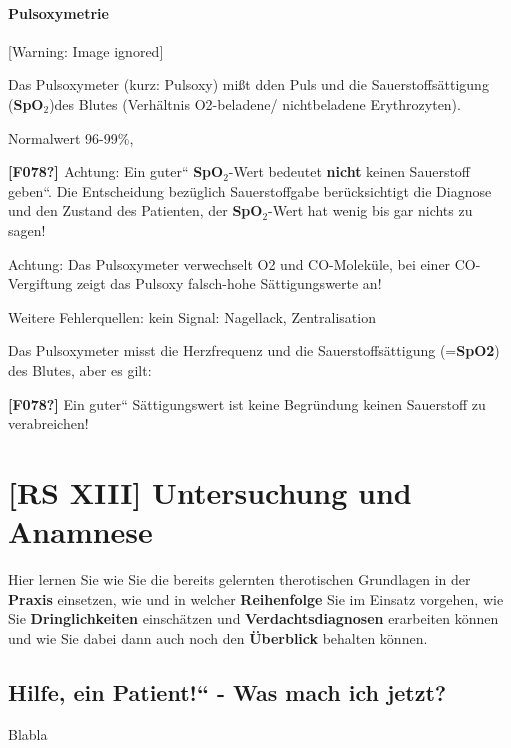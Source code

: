 \documentclass{article}
\newcommand\gSub[1]{\ensuremath{{}_{\text{#1}}}}
\newcommand\gEs[1]{\textbf{\textcolor[rgb]{0.0,0.0,0.5019608}{#1}}}
\newcommand\gEs[1]{\textbf{\textcolor[rgb]{0.0,0.0,0.5019608}{#1}}}
\newcommand\gT[1]{\textbf{\textup{\textcolor[rgb]{0.0,0.5019608,0.0}{#1}}}}
\begin{document}
\paragraph[Pulsoxymetrie]{Pulsoxymetrie%
%
}
\begin{center}
 [Warning: Image ignored] %

\end{center}
{\mdseries
Das Pulsoxymeter (kurz: Pulsoxy) mi{\ss}t dden Puls und die
Sauerstoffs\"attigung
(\gT{SpO}\gT{\gSub{2}})des
Blutes (Verh\"altnis O2-beladene/ nichtbeladene Erythrozyten). }

{\mdseries
Normalwert 96-99\%, }

{\mdseries
\textbf{\textcolor[rgb]{0.7882353,0.0,0.08627451}{[F078?] }}Achtung: Ein
{\quotedblbase}guter{\textquotedblleft}
\gT{SpO}\gT{\gSub{2}}{}-Wert
bedeutet \gEs{nicht} {\quotedblbase}keinen
Sauerstoff geben{\textquotedblleft}. Die Entscheidung bez\"uglich
Sauerstoffgabe ber\"ucksichtigt die Diagnose und den Zustand des
Patienten, der
\gT{SpO}\gT{\gSub{2}}{}-Wert
hat wenig bis gar nichts zu sagen! }

{\mdseries\color{black}
Achtung: Das Pulsoxymeter verwechselt O2 und CO-Molek\"ule, bei einer
CO-Vergiftung zeigt das Pulsoxy falsch-hohe S\"attigungswerte an!}

{\mdseries
Weitere Fehlerquellen: kein Signal: Nagellack, Zentralisation}

{\mdseries
Das Pulsoxymeter misst die Herzfrequenz und die Sauerstoffs\"attigung
(=\gT{SpO2}) des Blutes, aber es gilt:}

{\mdseries\color{black}
\textbf{\textcolor[rgb]{0.7882353,0.0,0.08627451}{[F078?]}} Ein
{\quotedblbase}guter{\textquotedblleft} S\"attigungswert ist keine
Begr\"undung keinen Sauerstoff zu verabreichen!}

\section{[RS XIII] Untersuchung und Anamnese}
Hier lernen Sie wie Sie die bereits gelernten therotischen Grundlagen in
der \gEs{Praxis} einsetzen, wie und in welcher
\gEs{Reihenfolge} Sie im Einsatz vorgehen, wie Sie
\gEs{Dringlichkeiten} einsch\"atzen und
\gEs{Verdachtsdiagnosen} erarbeiten k\"onnen und wie
Sie dabei dann auch noch den \gEs{\"Uberblick}
behalten k\"onnen.

\subsection{{\quotedblbase}Hilfe, ein Patient!{\textquotedblleft} - Was
mach{\textquotesingle} ich jetzt?}
Blabla
\end{document}
